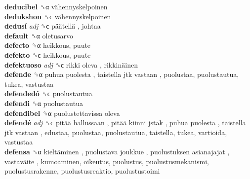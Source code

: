 \textbf{deducibel} ␝α   vähennyskelpoinen   \\
\textbf{dedukshon} ␝ϲ   vähennyskelpoinen   \\
\textbf{dedusí} \emph{adj}  ␝ϲ   päätellä , johtaa  \\
\textbf{default} ␝α  oletusarvo  \\
\textbf{defecto} ␝α  heikkous, puute  \\
\textbf{defekto} ␝ϲ  heikkous, puute  \\
\textbf{defektuoso} \emph{adj}  ␝ϲ   rikki oleva ,  rikkinäinen   \\
\textbf{defende} ␝α   puhua puolesta ,  taistella jtk vastaan , puolustaa, puolustautua, tukea, vastustaa  \\
\textbf{defendedó} ␝ϲ  puolustautua  \\
\textbf{defendi} ␝α  puolustautua  \\
\textbf{defendibel} ␝α   puolustettavissa oleva   \\
\textbf{defendé} \emph{adj}  ␝ϲ   pitää hallussaan ,  pitää kiinni jstak ,  puhua puolesta ,  taistella jtk vastaan , edustaa, puolustaa, puolustautua, taistella, tukea, vartioida, vastustaa  \\
\textbf{defensa} ␝α   kieltäminen ,  puolustava joukkue ,  puolustuksen asianajajat ,  vastaväite , kumoaminen, oikeutus, puolustus, puolustusmekanismi, puolustusrakenne, puolustusreaktio, puolustustoimi  \\
